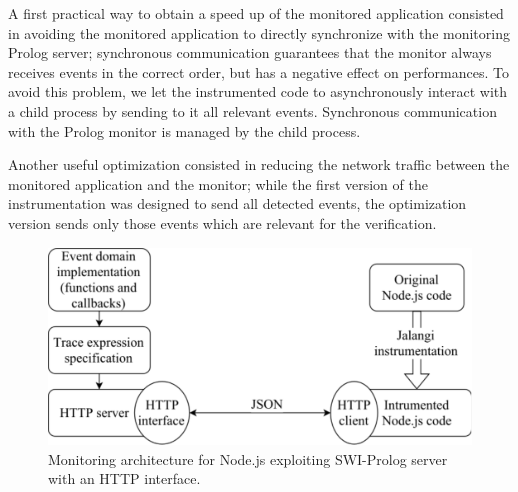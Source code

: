 A first practical way to obtain a speed up of the monitored application consisted in
avoiding the monitored application to directly synchronize with the monitoring Prolog server;
synchronous communication guarantees that the monitor always receives events in the correct order,
but has a negative effect on performances. To avoid this problem, we let the instrumented code
to asynchronously interact with a child process by sending to it all relevant events. Synchronous
communication with the Prolog  monitor is managed by the child process.

Another useful optimization consisted in reducing the network traffic 
between the monitored application and the monitor; while
the first version of the instrumentation was designed to send
all detected events, the optimization version sends only those events 
which are relevant for the verification.


\begin{figure}
\centering\includegraphics[width=.7\textwidth]{fig/diagram}
\caption{Monitoring architecture for Node.js exploiting SWI-Prolog server with an HTTP interface.}
\label{fig:arch}
\end{figure}

